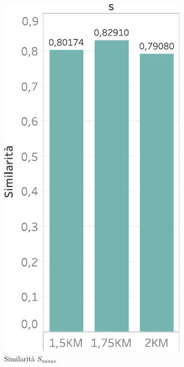 \begin{figure}
  \centering
   \begin{subfigure}{.5\textwidth}
  \centering
      \includegraphics[scale=0.6]{res/fig/sec-4/scalability/ComparisonSSimilarity.pdf}
  \caption{Similarità \(S_{minus}\)}%
\end{subfigure}%
\begin{subfigure}{.5\textwidth}
  \centering

\end{subfigure}
\end{figure}

